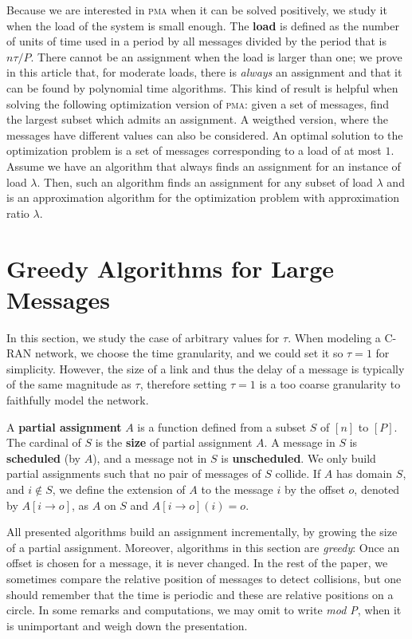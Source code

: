 \documentclass[a4paper,UKenglish,cleveref, autoref, thm-restate]{lipics-v2019}
\newcommand\pma{\textsc{pma}\xspace}
\begin{document}
Because we are interested in \pma when it can be solved positively, we study it when the load of the system is small enough. The \textbf{load} is defined as the number of units of time used in a period by all messages divided by the period that is $n\tau /P$. There cannot be an assignment when the load is larger than one; we prove in this article that, for moderate loads, there is \emph{always} an assignment and that it can be found by polynomial time algorithms. This kind of result is helpful when solving the following optimization version of \pma: given a set of messages, find the largest subset 
which admits an assignment. A weigthed version, where the messages have different values can also be considered. An optimal solution to the optimization problem is a set of messages corresponding to a load of at most $1$. Assume we have an algorithm that always finds an assignment for an instance of load $\lambda$. Then, such an algorithm finds an assignment for any subset of load $\lambda$
and is an approximation algorithm for the optimization problem with approximation ratio $\lambda$.


\section{Greedy Algorithms for Large Messages} \label{sec:large}

In this section, we study the case of arbitrary values for $\tau$. When modeling a C-RAN network,
we choose the time granularity, and we could set it so $\tau = 1$ for simplicity. However, the size of a link and thus the delay of a message
is typically of the same magnitude as $\tau$, therefore setting $\tau = 1$ is a too coarse granularity to faithfully model the network.

A \textbf{partial assignment} $A$ is a function defined from a subset $S$ of $[n]$ to $[P]$.
The cardinal of $S$ is the \textbf{size} of partial assignment $A$. A message in $S$ is \textbf{scheduled} (by $A$), and a message not in $S$ is \textbf{unscheduled}. We only build partial assignments such that no pair of messages of $S$ collide. If $A$ has domain $S$, and $i \notin S$, we define the extension of $A$ to the message $i$ by the offset $o$, denoted by $A[i \rightarrow o]$, as $A$ on $S$ and $A[i \rightarrow o](i) = o$.

All presented algorithms build an assignment incrementally, by growing the size of a partial assignment. Moreover, algorithms in this section are \emph{greedy}: Once an offset is chosen for a message, it is never changed. In the rest of the paper, we sometimes compare the relative position of messages to detect collisions, but one should remember that the time is periodic and these are relative positions on a circle. 
In some remarks and computations, we may omit to write \emph{mod P}, when it is unimportant and weigh down the presentation.
\end{document}

